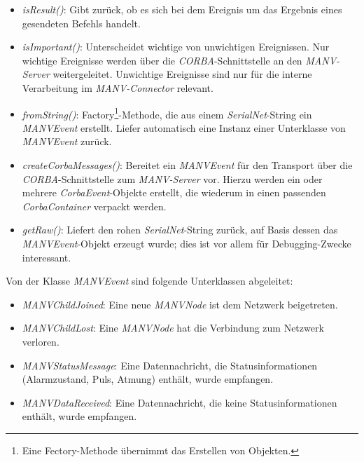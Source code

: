     \begin{itemize}
            \item{\emph{isResult()}:} Gibt zurück, ob es sich bei dem Ereignis um das Ergebnis eines gesendeten Befehls handelt. 
            \item{\emph{isImportant()}:} Unterscheidet wichtige von unwichtigen Ereignissen. Nur wichtige Ereignisse werden über 
                                  die \emph{CORBA}-Schnittstelle an den \emph{MANV-Server} weitergeleitet. Unwichtige 
                                  Ereignisse sind nur für die interne Verarbeitung im \emph{MANV-Connector} relevant. 
            \item{\emph{fromString()}:}  Factory\footnote{Eine Fectory-Methode übernimmt das 
                                                 Erstellen von Objekten.}-Methode, die aus einem 
                                                 \emph{SerialNet}-String ein \emph{MANV\-Event} erstellt. 
                                  Liefer automatisch eine Instanz einer Unterklasse von \emph{MANV\-Event} zurück.
            \item{\emph{createCorbaMessages()}:} Bereitet ein \emph{MANVEvent} für den Transport über die 
                                          \emph{CORBA}-Schnittstelle zum \emph{MANV-Server} vor. Hierzu werden ein oder 
                                          mehrere \emph{CorbaEvent}-Objekte erstellt, die wiederum in einen
                                          passenden \emph{CorbaContainer} verpackt werden.
            \item{\emph{getRaw()}:} Liefert den rohen \emph{SerialNet}-String zurück, auf Basis dessen das \emph{MANVEvent}-Objekt 
                             erzeugt wurde; dies ist vor allem für Debugging-Zwecke interessant.
    \end{itemize}

    Von der Klasse \emph{MANVEvent} sind folgende Unterklassen abgeleitet:

    \begin{itemize}
        \item{\emph{MANVChildJoined}:} Eine neue \emph{MANVNode} ist dem Netzwerk beigetreten.
        \item{\emph{MANVChildLost}:} Eine \emph{MANVNode} hat die Verbindung zum Netzwerk verloren.
        \item{\emph{MANVStatusMessage}:} Eine Datennachricht, die Statusinformationen (Alarmzustand, Puls, Atmung) enthält,
                                  wurde empfangen.
        \item{\emph{MANVDataReceived}:} Eine Datennachricht, die keine Statusinformationen enthält, wurde empfangen.
    \end{itemize}

